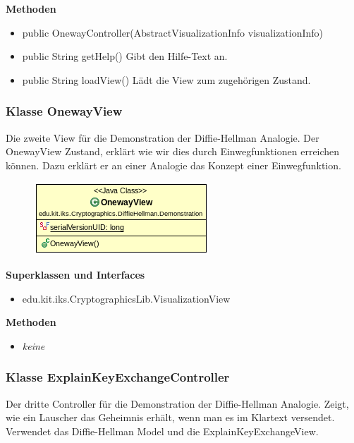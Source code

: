 \documentclass{article}
\begin{document}
      \textbf{Methoden}
      \begin{itemize}
          \item public OnewayController(AbstractVisualizationInfo visualizationInfo)
        \item public String getHelp() \newline
        Gibt den Hilfe-Text an.
        \item public String loadView() \newline
        Lädt die View zum zugehörigen Zustand.
      \end{itemize}

\subsubsection{Klasse OnewayView}
      Die zweite View für die Demonstration der Diffie-Hellman Analogie.
      Der OnewayView Zustand, erklärt wie wir dies durch Einwegfunktionen
      erreichen können. Dazu erklärt er an einer Analogie das Konzept
      einer Einwegfunktion.

      \begin{figure}[H]
        \centering
        \includegraphics{resources/edu-kit-iks-Cryptographics-DiffieHellman-Demonstration-OnewayView}
      \end{figure}

      \textbf{Superklassen und Interfaces}
      \begin{itemize}
        \item edu.kit.iks.CryptographicsLib.VisualizationView
      \end{itemize}

      \textbf{Methoden}
      \begin{itemize}
        \item \textit{keine}
      \end{itemize}

\subsubsection{Klasse ExplainKeyExchangeController}
      Der dritte Controller für die Demonstration der Diffie-Hellman Analogie.
      Zeigt, wie ein Lauscher das Geheimnis erhält, wenn man es
      im Klartext versendet.
      Verwendet das Diffie-Hellman Model und die ExplainKeyExchangeView.
\end{document}

